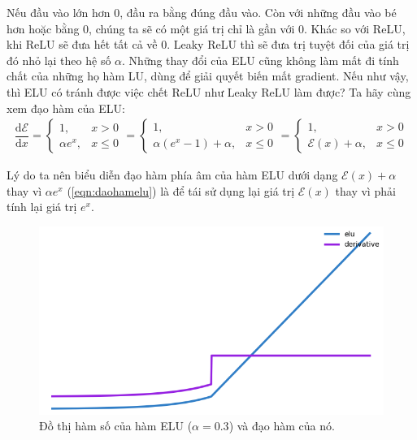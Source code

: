 Nếu đầu vào lớn hơn 0, đầu ra bằng đúng đầu vào.
Còn với những đầu vào bé hơn hoặc bằng 0, chúng ta sẽ có một giá trị chỉ là gần với 0.
Khác so với ReLU, khi ReLU sẽ đưa hết tất cả về 0.
Leaky ReLU thì sẽ đưa trị tuyệt đối của giá trị đó nhỏ lại theo hệ số $\alpha$.
Những thay đổi của ELU cũng không làm mất đi tính chất của những họ hàm LU, dùng để giải quyết biến mất gradient.
Nếu như vậy, thì ELU có tránh được việc chết ReLU như Leaky ReLU làm được?
Ta hãy cùng xem đạo hàm của ELU:
\begin{align}
    \dfrac{\text{d}\mathcal{E}}{\text{d}x} =  \begin{cases}1, &x > 0\\\alpha e^x, &x \le 0\end{cases} =  \begin{cases}1, &x > 0\\\alpha\left(e^x - 1\right) + \alpha, &x \le 0\end{cases} =  \begin{cases}1, &x > 0\\\mathcal{E}(x) + \alpha, &x \le 0\end{cases}\label{eqn:daohamelu}
\end{align}

Lý do ta nên biểu diễn đạo hàm phía âm của hàm ELU dưới dạng $\mathcal{E}(x) + \alpha$ thay vì $\alpha e^x$ (\ref{eqn:daohamelu}) là để tái sử dụng lại giá trị $\mathcal{E}(x)$ thay vì phải tính lại giá trị $e^x$.
\vspace{5pt}

\begin{figure}[!h]
\captionsetup{width=0.8\textwidth}
\centering
\includegraphics[width=15cm]{images/elufunc.PNG}
\caption{Đồ thị hàm số của hàm ELU ($\alpha = 0.3$) và đạo hàm của nó.}
\label{fig:elufunc}
\end{figure}

